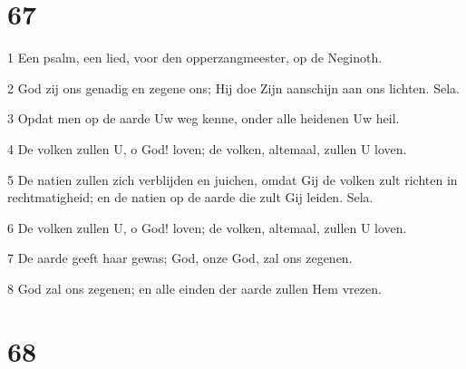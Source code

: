 \chapter{67}

\par 1 Een psalm, een lied, voor den opperzangmeester, op de Neginoth.
\par 2 God zij ons genadig en zegene ons; Hij doe Zijn aanschijn aan ons lichten. Sela.
\par 3 Opdat men op de aarde Uw weg kenne, onder alle heidenen Uw heil.
\par 4 De volken zullen U, o God! loven; de volken, altemaal, zullen U loven.
\par 5 De natien zullen zich verblijden en juichen, omdat Gij de volken zult richten in rechtmatigheid; en de natien op de aarde die zult Gij leiden. Sela.
\par 6 De volken zullen U, o God! loven; de volken, altemaal, zullen U loven.
\par 7 De aarde geeft haar gewas; God, onze God, zal ons zegenen.
\par 8 God zal ons zegenen; en alle einden der aarde zullen Hem vrezen.

\chapter{68}

